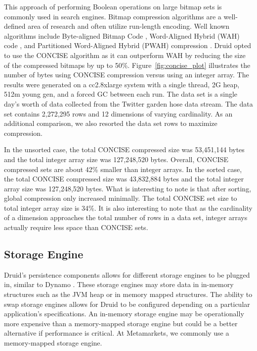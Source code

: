 \documentclass{vldb}
\begin{document}
This approach of performing Boolean operations on large bitmap sets is
commonly used in search engines. Bitmap compression algorithms are a
well-defined area of research and often utilize run-length
encoding. Well known algorithms include Byte-aligned Bitmap Code \cite{antoshenkov1995byte},
Word-Aligned Hybrid (WAH) code \cite{wu2006optimizing}, and Partitioned Word-Aligned
Hybrid (PWAH) compression \cite{van2011memory}. Druid opted to use the CONCISE
algorithm \cite{colantonio2010concise} as it can outperform WAH by reducing the size of the
compressed bitmaps by up to 50\%.  Figure~\ref{fig:concise_plot} illustrates the number of
bytes using CONCISE compression versus using an integer array. The
results were generated on a cc2.8xlarge system with a single thread,
2G heap, 512m young gen, and a forced GC between each run. The data
set is a single day’s worth of data collected from the Twitter garden
hose \cite{twitter2013} data stream. The data set contains 2,272,295 rows and 12
dimensions of varying cardinality. As an additional comparison, we
also resorted the data set rows to maximize compression.

In the unsorted case, the total CONCISE compressed size was 53,451,144
bytes and the total integer array size was 127,248,520 bytes. Overall,
CONCISE compressed sets are about 42\% smaller than integer arrays.
In the sorted case, the total CONCISE compressed size was 43,832,884
bytes and the total integer array size was 127,248,520 bytes.  What is
interesting to note is that after sorting, global compression only
increased minimally. The total CONCISE set size to total integer array
size is 34\%. It is also interesting to note that as the cardinality
of a dimension approaches the total number of rows in a data set,
integer arrays actually require less space than CONCISE sets.

\subsection{Storage Engine}
Druid’s persistence components allows for different storage engines to
be plugged in, similar to Dynamo \cite{decandia2007dynamo}. These storage engines may store
data in in-memory structures such as the JVM heap or in memory mapped
structures. The ability to swap storage engines allows for Druid to be
configured depending on a particular application’s specifications. An
in-memory storage engine may be operationally more expensive than a
memory-mapped storage engine but could be a better alternative if
performance is critical. At Metamarkets, we commonly use a
memory-mapped storage engine.
\end{document}
